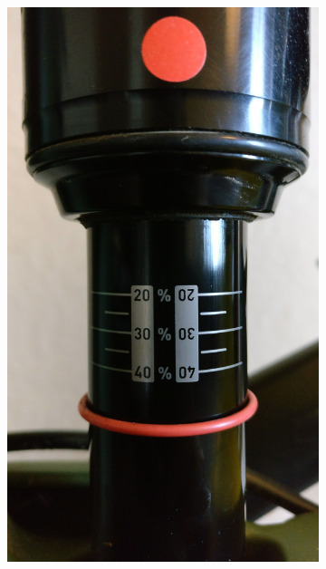 		\begin{figure}[h!]
			\begin{subfigure}[t]{0.5\textwidth}
				\centering
				\includegraphics[scale=0.05]{../images/results/100_rs.jpg}
			\end{subfigure}
			\begin{subfigure}[t]{0.5\textwidth}
				\centering

\end{subfigure}
\end{figure}

